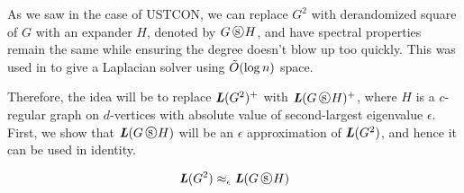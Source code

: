 \documentclass{article}
\begin{document}
As we saw in the case of USTCON, we can replace $G^2$ with derandomized square of $G$ with an expander $H$, denoted by $G\dsquare H$, and have spectral properties remain the same while ensuring the  degree doesn't blow up too quickly. This was used in \cite{murtaghDerandomizationConnectivityUndirected2017} to give a Laplacian solver using $\Tilde{O}(\log n)$ space. 

Therefore, the idea will be to replace $\boldsymbol{\mathit{L}}(G^2)^+$ with $\LL(G\dsquare H)^+$, where $H$ is a $c$-regular graph on $d$-vertices with absolute value of second-largest eigenvalue $\epsilon$. First, we show that $\LL(G\dsquare H)$ will be an $\epsilon$ approximation of $\boldsymbol{\mathit{L}}(G^2)$, and hence it can be used in identity.

\begin{lemma}\label{spec-approx}
    $$\LL(G^2)\approx_{\epsilon}\LL(G\dsquare H)$$
\end{lemma}
\end{document}
